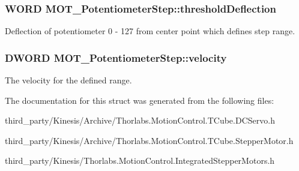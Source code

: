 \subsubsection[{\texorpdfstring{threshold\+Deflection}{thresholdDeflection}}]{\setlength{\rightskip}{0pt plus 5cm}W\+O\+RD M\+O\+T\+\_\+\+Potentiometer\+Step\+::threshold\+Deflection}\hypertarget{struct_m_o_t___potentiometer_step_a248efc12a3d3784ff48fd510bb1fb121}{}\label{struct_m_o_t___potentiometer_step_a248efc12a3d3784ff48fd510bb1fb121}


Deflection of potentiometer 0 -\/ 127 from center point which defines step range. 

\subsubsection[{\texorpdfstring{velocity}{velocity}}]{\setlength{\rightskip}{0pt plus 5cm}D\+W\+O\+RD M\+O\+T\+\_\+\+Potentiometer\+Step\+::velocity}\hypertarget{struct_m_o_t___potentiometer_step_a2b60a90461ec1c1b1ae291b30a070cf1}{}\label{struct_m_o_t___potentiometer_step_a2b60a90461ec1c1b1ae291b30a070cf1}


The velocity for the defined range. 



The documentation for this struct was generated from the following files\+:\begin{DoxyCompactItemize}
\item 
third\+\_\+party/\+Kinesis/\+Archive/Thorlabs.\+Motion\+Control.\+T\+Cube.\+D\+C\+Servo.\+h\item 
third\+\_\+party/\+Kinesis/\+Archive/Thorlabs.\+Motion\+Control.\+T\+Cube.\+Stepper\+Motor.\+h\item 
third\+\_\+party/\+Kinesis/Thorlabs.\+Motion\+Control.\+Integrated\+Stepper\+Motors.\+h\end{DoxyCompactItemize}
